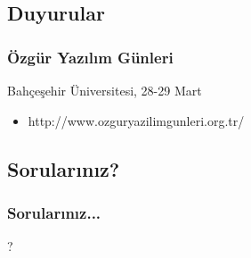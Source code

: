 \documentclass{beamer}
\begin{document}
	\subsection{Duyurular}
	\begin{frame}
	\frametitle{Özgür Yazılım Günleri}
			Bahçeşehir Üniversitesi, 28-29 Mart
			\begin{itemize}
				\item http://www.ozguryazilimgunleri.org.tr/
			\end{itemize}
	\end{frame}

	\subsection{Sorularınız?}
	\begin{frame}
	 	\frametitle{Sorularınız...}
		\begin{center}
		 ?
		\end{center}
		
	\end{frame}
\end{document}
